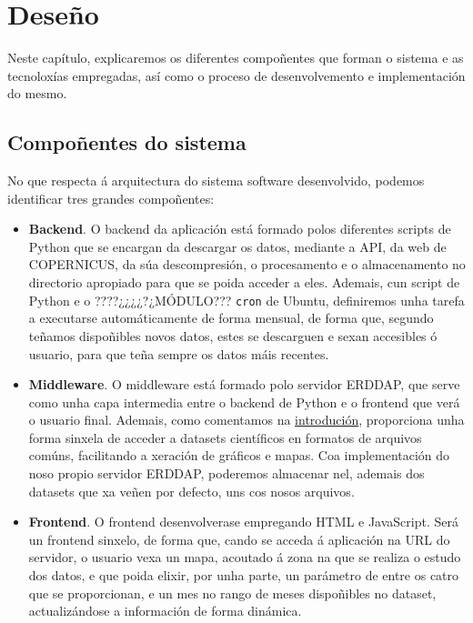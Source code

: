 \chapter{Deseño}

Neste capítulo, explicaremos  os diferentes compoñentes que forman o sistema e as tecnoloxías empregadas, así como o proceso de desenvolvemento e implementación do mesmo.

\section{Compoñentes do sistema}\label{componentes}
No que respecta á arquitectura do sistema software desenvolvido, podemos identificar tres grandes compoñentes:
\begin{itemize}
    \item \textbf{Backend}. O backend da aplicación está formado polos diferentes scripts de Python que se encargan da descargar os datos, mediante a API, da web de COPERNICUS, da súa
    descompresión, o procesamento e o almacenamento no directorio apropiado para que se poida acceder a eles. Ademais, cun script de Python e o ????¿¿¿¿?¿MÓDULO??? \texttt{cron} de Ubuntu,
    definiremos unha tarefa a executarse automáticamente de forma mensual, de forma que, segundo teñamos dispoñibles novos datos, estes se descarguen e sexan accesibles ó usuario, para que
    teña sempre os datos máis recentes.
    \item \textbf{Middleware}. O middleware está formado polo servidor ERDDAP, que serve como unha capa intermedia entre o backend de Python e o frontend que verá o usuario final.
    Ademais, como comentamos na \hyperref[descricion]{introdución}, proporciona unha forma sinxela de acceder a datasets científicos en formatos de arquivos comúns, facilitando a
    xeración de gráficos e mapas. Coa implementación do noso propio servidor ERDDAP, poderemos almacenar nel, ademais dos datasets que xa veñen por defecto, uns cos nosos arquivos.
    \item \textbf{Frontend}. O frontend desenvolverase empregando HTML e JavaScript. Será un frontend sinxelo, de forma que, cando se acceda á aplicación na URL do servidor, o usuario
    vexa un mapa, acoutado á zona na que se realiza o estudo dos datos, e que poida elixir, por unha parte, un parámetro de entre os catro que se proporcionan, e un mes no rango de
    meses dispoñibles no dataset, actualizándose a información de forma dinámica.
\end{itemize}

